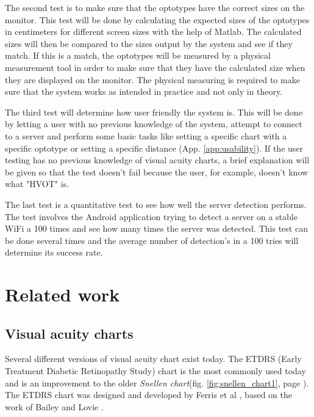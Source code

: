 \documentclass[12pt,a4paper,notitlepage]{report}
\begin{document}
The second test is to make sure that the optotypes have the correct sizes on the monitor. This test will be done by calculating the expected sizes of the optotypes in centimeters for different screen sizes with the help of Matlab. The calculated sizes will then be compared to the sizes output by the system and see if they match. If this is a match, the optotypes will be measured by a physical measurement tool in order to make sure that they have the calculated size when they are displayed on the monitor. The physical measuring is required to make sure that the system works as intended in practice and not only in theory.

The third test will determine how user friendly the system is. This will be done by letting a user with no previous knowledge of the system, attempt to connect to a server and perform some basic tasks like setting a specific chart with a specific optotype or setting a specific distance (App. \ref{app:usability}). If the user testing has no previous knowledge of visual acuity charts, a brief explanation will be given so that the test doesn't fail because the user, for example, doesn't know what "HVOT" is.

The last test is a quantitative test to see how well the server detection performs. The test involves the Android application trying to detect a server on a stable WiFi a 100 times and see how many times the server was detected. This test can be done several times and the average number of detection's in a 100 tries will determine its success rate.

\section{Related work}

\subsection{Visual acuity charts}
Several different versions of visual acuity chart exist today. The ETDRS (Early Treatment Diabetic Retinopathy Study) chart is the most commonly used today and is an improvement to the older \textit{Snellen chart}(fig. \ref{fig:snellen_chart1}, page \pageref{fig:snellen_chart1}). The ETDRS chart was designed and developed by Ferris et al \cite{Ferris}, based on the work of Bailey and Lovie \cite{Bailey}. 

\end{document}
